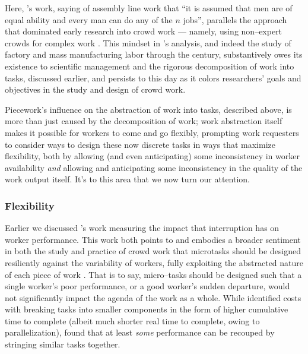 \documentclass[trackingWork]{subfiles}
\begin{document}
{Here, \citeauthor{hu1961parallel}'s work,
saying of assembly line work that
``it is assumed that men are of equal ability and every man can do any of the $n$ jobs'',
parallels the approach that dominated early research into crowd work
--- namely, using non--expert crowds for complex work
\cite{hu1961parallel}.
This mindset in \citeauthor{hu1961parallel}'s analysis,
and indeed the study of factory and mass manufacturing labor through the  century,
substantively owes its existence to scientific management
and the rigorous decomposition of work into tasks, discussed earlier,
and persists to this day as it colors
researchers' goals and objectives in the study and design of crowd work.

Piecework's influence on the abstraction of work into tasks,
described above, is more than just caused by the decomposition of work;
work abstraction itself makes it possible for workers to come and go flexibly,
prompting work requesters to consider ways to design these now discrete tasks in ways that
maximize flexibility, both by allowing (and even anticipating) some inconsistency in worker availability
\textit{and} allowing and anticipating some inconsistency in the quality of the work output itself.
It's to this area that we now turn our attention.

\subsubsection{Flexibility}\label{sec:flexibility}

Earlier we discussed \citeauthor{cheng2015break}'s work
measuring the impact that interruption has on worker performance.
This work both points to and embodies a broader sentiment in
both the study and practice
of crowd work that microtasks should be designed resiliently against the variability of workers,
fully exploiting the abstracted nature of each piece of work
\cite{interruptionIqbal,delayAndOrderLasecki,vaish2014low}.
That is to say, micro--tasks should be designed such that a single worker's poor performance,
or a good worker's sudden departure,
would not significantly impact the agenda of the work as a whole.
While \citeauthor{cheng2015break} identified costs with breaking tasks into smaller components
in the form of higher cumulative time to complete
(albeit much shorter real time to complete, owing to parallelization),
\citeauthor{delayAndOrderLasecki} found that at least \textit{some} performance can be recouped by stringing 
similar tasks together.


}
\end{document}
